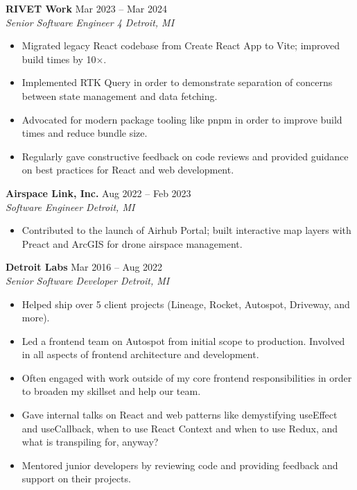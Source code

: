 \documentclass[10pt,letterpaper]{article}
\newcommand{\entry}[4]{%
  {\small\bfseries #1} \hfill {\footnotesize\color{light}#2} \\[-1pt]
  {\footnotesize\itshape #3 \hfill #4} \\[-4pt]
}
\begin{document}
\vspace{2pt}
\entry{RIVET Work}{Mar 2023 -- Mar 2024}{Senior Software Engineer 4}{Detroit, MI}
\begin{itemize}[nosep]
  \item {\small Migrated legacy React codebase from Create React App to Vite; improved build times by 10$\times$.}
  \item {\small Implemented RTK Query in order to demonstrate separation of concerns between state management and data fetching.}
  \item {\small Advocated for modern package tooling like pnpm in order to improve build times and reduce bundle size.}
  \item {\small Regularly gave constructive feedback on code reviews and provided guidance on best practices for React and web development.}
\end{itemize}

\vspace{2pt}
\entry{Airspace Link, Inc.}{Aug 2022 -- Feb 2023}{Software Engineer}{Detroit, MI}
\begin{itemize}[nosep]
  \item {\small Contributed to the launch of Airhub Portal; built interactive map layers with Preact and ArcGIS for drone airspace management.}
\end{itemize}

\vspace{2pt}
\entry{Detroit Labs}{Mar 2016 -- Aug 2022}{Senior Software Developer}{Detroit, MI}
\begin{itemize}[nosep]
  \item {\small Helped ship over 5 client projects (Lineage, Rocket, Autospot, Driveway, and more).}
  \item {\small Led a frontend team on Autospot from initial scope to production. Involved in all aspects of frontend architecture and development.}
  \item {\small Often engaged with work outside of my core frontend responsibilities in order to broaden my skillset and help our team.}
  \item {\small Gave internal talks on React and web patterns like demystifying useEffect and useCallback, when to use React Context and when to use Redux, and what is transpiling for, anyway?}
  \item {\small Mentored junior developers by reviewing code and providing feedback and support on their projects.}
\end{itemize}
\end{document}
